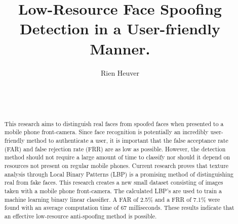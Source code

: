 \documentclass{sig-alternate-br}
\begin{document}
	

\title{Low-Resource Face Spoofing Detection in a User-friendly Manner.}



\author{
\alignauthor
Rien Heuver\\
       \\
       \\
       \\
}

\maketitle

\begin{abstract}
This research aims to distinguish real faces from spoofed faces when presented to a mobile phone front-camera. Since face recognition is potentially an incredibly user-friendly method to authenticate a user, it is important that the false acceptance rate (FAR) and false rejection rate (FRR) are as low as possible. However, the detection method should not require a large amount of time to classify nor should it depend on resources not present on regular mobile phones. Current research proves that texture analysis through Local Binary Patterns (LBP) is a promising method of distinguishing real from fake faces. This research creates a new small dataset consisting of images taken with a mobile phone front-camera. The calculated LBP's are used to train a machine learning binary linear classifier. A FAR of 2.5\% and a FRR of 7.1\% were found with an average computation time of 67 milliseconds. These results indicate that an effective low-resource anti-spoofing method is possible.
\end{abstract}
\end{document}
